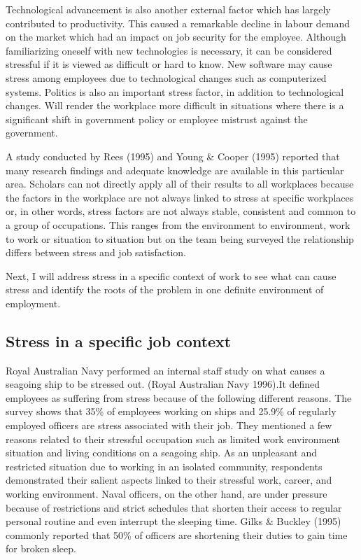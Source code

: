 Technological advancement is also another external factor which has largely contributed to productivity. This caused a remarkable decline in labour demand on the market which had an impact on job security for the employee. Although familiarizing oneself with new technologies is necessary, it can be considered stressful if it is viewed as difficult or hard to know. New software may cause stress among employees due to technological changes such as computerized systems. Politics is also an important stress factor, in addition to technological changes. Will render the workplace more difficult in situations where there is a significant shift in government policy or employee mistrust against the government.  \citep[p.309-320]{Bloisi2007ManagementBehaviour}

A study conducted by Rees (1995) and Young \& Cooper (1995) reported that many research findings and adequate knowledge are available in this particular area. Scholars can not directly apply all of their results to all workplaces because the factors in the workplace are not always linked to stress at specific workplaces or, in other words, stress factors are not always stable, consistent and common to a group of occupations. This ranges from the environment to environment, work to work or situation to situation but on the team being surveyed the relationship differs between stress and job satisfaction.  \citep[p.  8]{Fairbrother2003WorkplaceSatisfaction}  

Next, I will address stress in a specific context of work to see what can cause stress and identify the roots of the problem in one definite environment of employment.
\subsection{Stress in a specific job context}
Royal Australian Navy performed an internal staff study on what causes a seagoing ship to be stressed out. (Royal Australian Navy 1996).It defined employees as suffering from stress because of the following different reasons. The survey shows that 35\% of employees working on ships and 25.9\% of regularly employed officers are stress associated with their job. They mentioned a few reasons related to their stressful occupation such as limited work environment situation and living conditions on a seagoing ship. As an unpleasant and restricted situation due to working in an isolated community, respondents demonstrated their salient aspects linked to their stressful work, career, and working environment.  Naval officers, on the other hand, are under pressure because of restrictions and strict schedules that shorten their access to regular personal routine and even interrupt the sleeping time.  Gilks \& Buckley (1995) commonly reported that 50\% of officers are shortening their duties to gain time for broken sleep.

